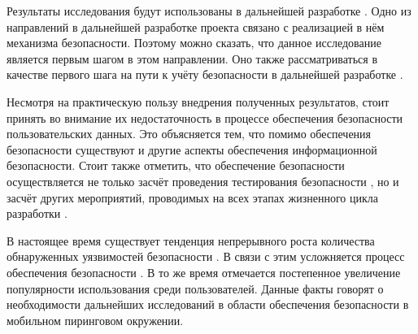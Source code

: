 

%
Результаты исследования будут использованы в дальнейшей разработке . 
%
Одно из направлений в дальнейшей разработке проекта связано с реализацией в нём механизма безопасности.
%
Поэтому можно сказать, что данное исследование является первым шагом в этом направлении. 
%
Оно также рассматриваться в качестве первого шага на пути к учёту безопасности в дальнейшей разработке .

%
Несмотря на практическую пользу внедрения полученных результатов, стоит принять во внимание их недостаточность в процессе обеспечения безопасности пользовательских данных. 
%
Это объясняется тем, что помимо обеспечения безопасности  существуют и другие аспекты обеспечения информационной безопасности. 
%
Стоит также отметить, что обеспечение безопасности  осуществляется не только засчёт проведения тестирования безопасности , но и засчёт других мероприятий, проводимых на всех этапах жизненного цикла разработки . 

%
В настоящее время существует тенденция непрерывного роста количества обнаруженных уязвимостей безопасности . 
%
В связи с этим усложняется процесс обеспечения безопасности . 
%
В то же время отмечается постепенное увеличение популярности использования  среди пользователей. 
%
Данные факты говорят о необходимости дальнейших исследований в области обеспечения безопасности  в мобильном пиринговом окружении. 